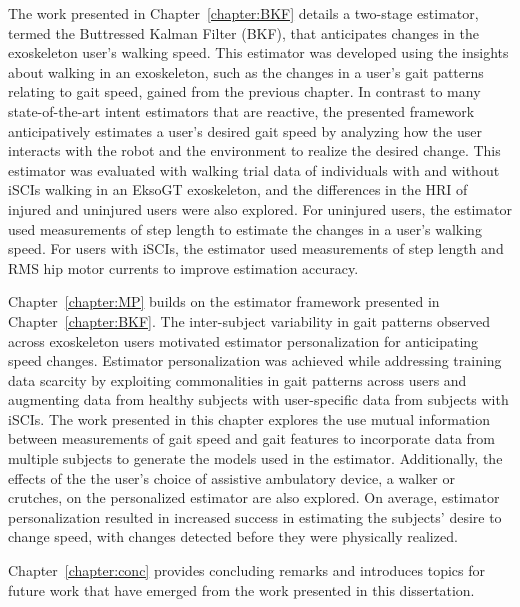 The work presented in Chapter~\ref{chapter:BKF} details a two-stage estimator, termed the Buttressed Kalman Filter (BKF), that anticipates changes in the exoskeleton user’s walking speed. This estimator was developed using the insights about walking in an exoskeleton, such as the changes in a user's gait patterns relating to gait speed, gained from the previous chapter. In contrast to many state-of-the-art intent estimators that are reactive, the presented framework anticipatively estimates a user's desired gait speed by analyzing how the user interacts with the robot and the environment to realize the desired change. This estimator was evaluated with walking trial data of individuals with and without iSCIs walking in an EksoGT exoskeleton, and the differences in the HRI of injured and uninjured users were also explored. For uninjured users, the estimator used measurements of step length to estimate the changes in a user's walking speed. For users with iSCIs, the estimator used measurements of step length and RMS hip motor currents to improve estimation accuracy.

Chapter~\ref{chapter:MP} builds on the estimator framework presented in Chapter~\ref{chapter:BKF}. The inter-subject variability in gait patterns observed across exoskeleton users motivated estimator personalization for anticipating speed changes. Estimator personalization was achieved while addressing training data scarcity by exploiting commonalities in gait patterns across users and augmenting data from healthy subjects with user-specific data from subjects with iSCIs. The work presented in this chapter explores the use mutual information between measurements of gait speed and gait features to incorporate data from multiple subjects to generate the models used in the estimator. Additionally, the effects of the the user's choice of assistive ambulatory device, a walker or crutches, on the personalized estimator are also explored. On average, estimator personalization resulted in increased success in estimating the subjects' desire to change speed, with changes detected before they were physically realized.

Chapter~\ref{chapter:conc} provides concluding remarks and introduces topics for future work that have emerged from the work presented in this dissertation.

